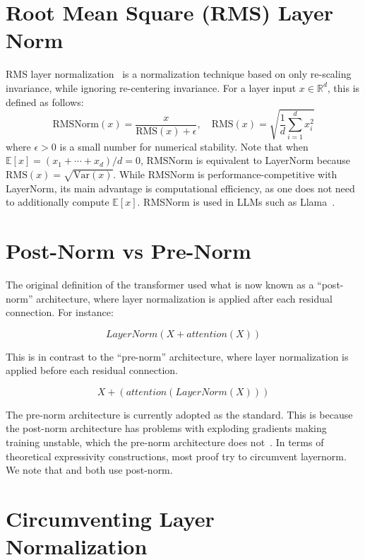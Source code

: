 \section{Root Mean Square (RMS) Layer Norm}
RMS layer normalization~\citep{zhang2019root} is a normalization technique based on only re-scaling invariance, while ignoring re-centering invariance.
For a layer input \(x \in \mathbb{R}^{d}\), this is defined as follows:
\begin{equation}
    \mathrm{RMSNorm}(x) = \frac{x}{\mathrm{RMS}(x) + \epsilon},
    \quad \mathrm{RMS}(x) = \sqrt{\frac{1}{d} \sum_{i = 1}^{d} x_i ^2}
\end{equation}
where \(\epsilon > 0\) is a small number for numerical stability.
Note that when \(\mathbb{E}[x] = (x_1 + \cdots + x_d)/d = 0\), RMSNorm is equivalent to LayerNorm because \(\mathrm{RMS}(x) = \sqrt{\mathrm{Var}(x)}\).
While RMSNorm is performance-competitive with LayerNorm, its main advantage is computational efficiency, as one does not need to additionally compute \(\mathbb{E}[x]\).
RMSNorm is used in LLMs such as Llama~\citep{touvron2023llama}.

\section{Post-Norm vs Pre-Norm}

The original definition of the transformer used what is now known as a ``post-norm'' architecture, where layer normalization is applied after each residual connection. For instance:

\[LayerNorm(X+attention(X))\]

This is in contrast to the ``pre-norm'' architecture, where layer normalization is applied before each residual connection.

\[X+(attention(LayerNorm(X)))\]

The pre-norm architecture is currently adopted as the standard. This is because the post-norm architecture has problems with exploding gradients making training unstable, which the pre-norm architecture does not~\citep{xiong2020layer}. In terms of theoretical expressivity constructions, most proof try to circumvent layernorm. We note that \citet{hahn-rofin-2024-sensitive} and \citet{yang2024counting} both use post-norm.



\section{Circumventing Layer Normalization}

